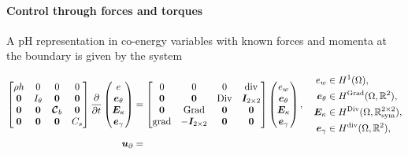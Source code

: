 \paragraph{Control through forces and torques} A pH representation in co-energy variables with known forces and momenta at the boundary is given by the system

\begin{subequations}\label{eq:phlinsys_Min1}
\begin{align}
\begin{bmatrix}
\rho h  & 0  & 0  & 0 \\
\bm{0} & I_\theta &  \bm{0} & \bm{0}\\
\bm{0}  & \bm{0}  & \bm{\mathcal{C}}_b  & \bm{0}\\
\bm{0} & \bm{0} &  \bm{0} & C_s \\
\end{bmatrix}
\diffp{}{t}
\begin{pmatrix}
e \\
\bm{e}_\theta \\
\bm{E}_\kappa \\
\bm{e}_{\gamma} \\
\end{pmatrix} &= 
\begin{bmatrix}
	0  & 0  & 0  & \div \\
	\bm{0} & \bm{0} &  \Div & \bm{I}_{2 \times 2}\\
	\bm{0}  & \Grad  & \bm{0}  & \bm{0}\\
	\grad & -\bm{I}_{2 \times 2} &  \bm{0} & \bm{0} \\
	\end{bmatrix}
\begin{pmatrix}
e_w \\
\bm{e}_{\theta} \\
\bm{E}_{\kappa} \\
\bm{e}_{\gamma} \\
\end{pmatrix}, \quad
\begin{aligned}
e_w &\in H^1(\Omega), \\
\bm{e}_{\theta} &\in H^{\Grad}(\Omega, \mathbb{R}^2), \\
\bm{E}_{\kappa} &\in H^{\Div}(\Omega,\mathbb{R}^{2\times 2}_{\text{sym}}), \\
\bm{e}_{\gamma} &\in H^{\div}(\Omega,\mathbb{R}^2), \\
\end{aligned} \label{eq:pHdyn_Min1}  \\
\bm{u}_\partial &= 

\end{align}
\end{subequations}

